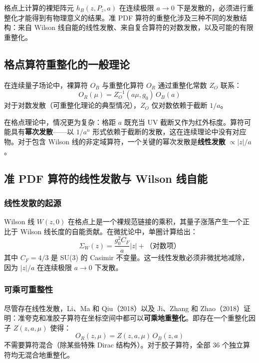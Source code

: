 \documentclass[11pt,a4paper]{ctexart}
\begin{document}
格点上计算的裸矩阵元 $h_B(z, P_z, a)$ 在连续极限 $a \to 0$ 下是发散的，必须进行重整化才能得到有物理意义的结果。准 PDF 算符的重整化涉及三种不同的发散结构：来自 Wilson 线自能的线性发散、来自复合算符的对数发散，以及可能的有限重整化。

\subsection{格点算符重整化的一般理论}

在连续量子场论中，裸算符 $O_B$ 与重整化算符 $O_R$ 通过重整化常数 $Z_O$ 联系：
\begin{equation}
O_R(\mu) = Z_O^{-1}(a\mu, g_0) \, O_B(a)
\end{equation}
对于对数发散（可重整化理论的典型情况），$Z_O$ 仅对数依赖于截断 $1/a$。

在格点理论中，情况更为复杂：格距 $a$ 既充当 UV 截断又作为红外标度。算符可能具有\textbf{幂次发散}——以 $1/a^n$ 形式依赖于截断的发散，这在连续理论中没有对应物。对于包含 Wilson 线的非定域算符，一个关键的幂次发散是\textbf{线性发散} $\propto |z|/a$。

\subsection{准 PDF 算符的线性发散与 Wilson 线自能}

\subsubsection{线性发散的起源}

Wilson 线 $W(z,0)$ 在格点上是一个裸规范链接的乘积，其量子涨落产生一个正比于 Wilson 线长度的自能贡献。在微扰论中，单圈计算给出：
\begin{equation}
\Sigma_W(z) = \frac{g_0^2 C_F}{a} |z| + \text{（对数项）}
\end{equation}
其中 $C_F = 4/3$ 是 SU(3) 的 Casimir 不变量。这一线性发散必须非微扰地减除，因为 $|z|/a$ 在连续极限 $a \to 0$ 下发散。

\subsubsection{可乘可重整性}

尽管存在线性发散，Li、Ma 和 Qiu（2018）以及 Ji、Zhang 和 Zhao（2018）证明：准夸克和准胶子算符在坐标空间中都可以\textbf{可乘地重整化}。即存在一个重整化因子 $Z(z, a, \mu)$ 使得：
\begin{equation}
O_R(z, \mu) = Z(z, a, \mu) \, O_B(z, a)
\end{equation}
不需要算符混合（除某些特殊 Dirac 结构外）。对于胶子算符，全部 36 个独立算符均无混合地重整化。
\end{document}
